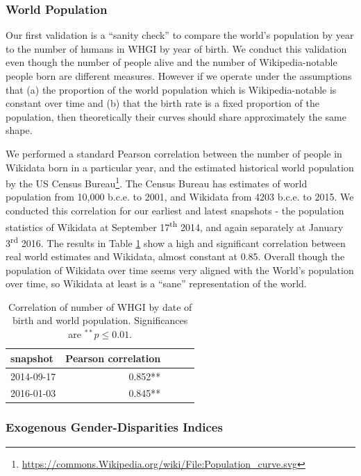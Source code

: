 \documentclass{sig-alternate-05-2015}
\begin{document}
\subsubsection{World Population} Our first validation is a ``sanity check'' to compare the world's population by year to the number of humans in WHGI by year of birth. We conduct this validation even though the number of people alive and the number of Wikipedia-notable people born are different measures. However if we operate under the assumptions that (a) the proportion of the world population which is Wikipedia-notable is constant over time and (b) that the birth rate is a fixed proportion of the population, then theoretically their curves should share approximately the same shape.

We performed a standard Pearson correlation between the number of people in Wikidata born in a particular year, and the estimated historical world population by the US Census
Bureau\footnote{\url{https://commons.Wikipedia.org/wiki/File:Population_curve.svg}}. The Census Bureau has estimates of world population from 10,000 b.c.e. to 2001, and Wikidata from 4203 b.c.e. to 2015. We conducted this correlation for our earliest and latest snapshots - the population statistics of Wikidata at September 17\textsuperscript{th} 2014, and again separately at January 3\textsuperscript{rd} 2016. The results in Table \ref{table:worldpop} show a high and significant correlation between real world estimates and Wikidata, almost constant at 0.85. Overall though the population of Wikidata over time seems very aligned with the World's population over time, so Wikidata at least is a ``sane'' representation of the world.

\begin{table}
\caption{Correlation of number of WHGI by date of birth and world population. Significances are $ ^{**}p\leq 0.01$.}
\label{table:worldpop}
\begin{tabular}{lrrrr}
\toprule
snapshot &  Pearson correlation \\
\midrule
2014-09-17 & 0.852**  \\
2016-01-03 & 0.845**  \\
\bottomrule
\end{tabular}
\end{table}

\subsubsection{Exogenous Gender-Disparities Indices}
\end{document}
